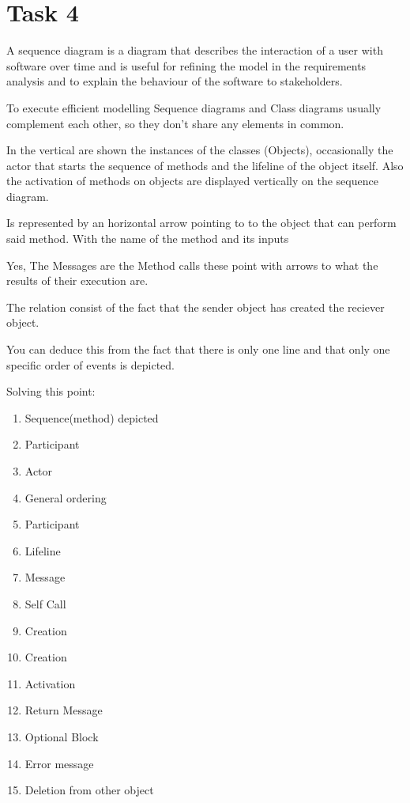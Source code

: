 \chapter{Task 4}
\begin{parlist}
	\item  A sequence diagram is a diagram that describes the interaction of a user with software over time and is useful for refining the model in the requirements analysis and to explain the behaviour of the software to stakeholders.\cite{uwlaxInformalSemanticsSequence}
	\item To execute efficient modelling Sequence diagrams and Class diagrams usually complement each other, so they don't share any elements in common.
	\item In the vertical are shown the instances of the classes (Objects), occasionally the actor that starts the sequence of methods and the lifeline of the object itself. Also the activation of methods on objects are displayed vertically on the sequence diagram.
	\item Is represented by an horizontal arrow pointing to to the object that can perform said method. With the name of the method and its inputs
	\item Yes, The Messages are the Method calls these point with arrows to what the results of their execution are.
	\item The relation consist of the fact that the sender object has created the reciever object.
	\item You can deduce this from the fact that there is only one line and that only one specific order of events is depicted.
	\item Solving this point:
	\begin{enumerate}
		\item Sequence(method) depicted
		\item Participant 
		\item Actor
		\item General ordering
		\item Participant
		\item Lifeline
		\item Message
		\item Self Call
		\item Creation
		\item Creation
		\item Activation
		\item Return Message
		\item Optional Block
		\item Error message
		\item Deletion from other object
	\end{enumerate}
\end{parlist}
